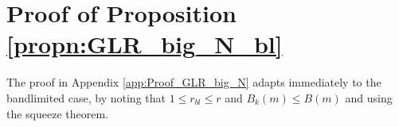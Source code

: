 \section{Proof of Proposition \ref{propn:GLR_big_N_bl}}
\label{app:Proof_GLR_big_N_bl}
The proof in Appendix \ref{app:Proof_GLR_big_N} adapts immediately to the bandlimited case, by noting that $1 \leq r_{bl} \leq r$ and $B_{k}(m) \leq B(m)$ and using the squeeze theorem. 